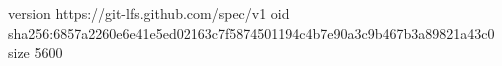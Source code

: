 version https://git-lfs.github.com/spec/v1
oid sha256:6857a2260e6e41e5ed02163c7f5874501194c4b7e90a3c9b467b3a89821a43c0
size 5600
